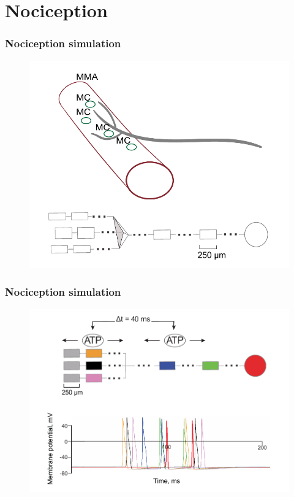 \documentclass[12pt, aspectratio=169]{beamer}
\begin{document}
\section{Nociception}
\begin{frame}
  \frametitle{Nociception simulation}
  \begin{figure}
    \includegraphics[width=0.7\linewidth]{1.pdf}
  \end{figure}
\end{frame}
\begin{frame}
  \frametitle{Nociception simulation}
  \begin{figure}
    \includegraphics[width=0.7\linewidth]{2_1.pdf}
  \end{figure}
\end{frame}
\end{document}
